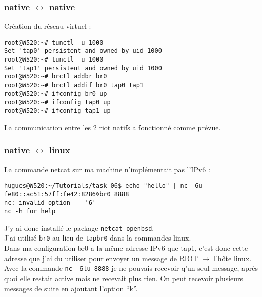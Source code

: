 \subsubsection{native $\leftrightarrow$ native}
Création du réseau virtuel :
\begin{verbatim}
root@W520:~# tunctl -u 1000
Set 'tap0' persistent and owned by uid 1000
root@W520:~# tunctl -u 1000
Set 'tap1' persistent and owned by uid 1000
root@W520:~# brctl addbr br0
root@W520:~# brctl addif br0 tap0 tap1
root@W520:~# ifconfig br0 up
root@W520:~# ifconfig tap0 up
root@W520:~# ifconfig tap1 up
\end{verbatim}

La communication entre les 2 riot natifs a fonctionné comme prévue.\\

\subsubsection{native $\leftrightarrow$ linux}
La commande netcat sur ma machine n'implémentait pas l'IPv6 :
{\footnotesize
\begin{verbatim}
hugues@W520:~/Tutorials/task-06$ echo "hello" | nc -6u fe80::ac51:57ff:fe42:8286%br0 8888
nc: invalid option -- '6'
nc -h for help
\end{verbatim}
}
J'y ai donc installé le package \texttt{netcat-openbsd}.\\

J'ai utilisé \texttt{br0} au lieu de \texttt{tapbr0} dans la commandes
linux.\\

Dans ma configuration br0 a la même adresse IPv6 que tap1, c'est donc
cette adresse que j'ai du utiliser pour envoyer un message de RIOT 
$\rightarrow$ l'hôte linux.\\

Avec la commande \texttt{nc -6lu 8888} je ne pouvais recevoir q'un seul
message, après quoi elle restait active mais ne recevait plus rien. On
peut recevoir plusieurs messages de suite en ajoutant l'option
\enquote{k}.\\

